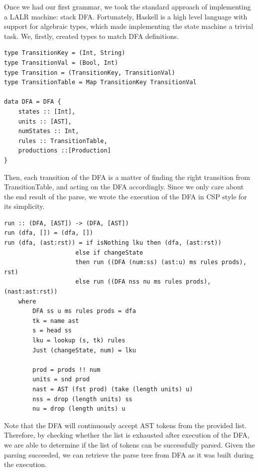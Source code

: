 \documentclass[12pt,letterpaper]{article}
\begin{document}
Once we had our first grammar, we took the standard approach of implementing a LALR machine: stack DFA. Fortunately, Haskell is a high level language with support for algebraic types, which made implementing the state machine a trivial task. We, firstly, created types to match DFA definitions.
\begin{lstlisting}
type TransitionKey = (Int, String)
type TransitionVal = (Bool, Int)
type Transition = (TransitionKey, TransitionVal)
type TransitionTable = Map TransitionKey TransitionVal

data DFA = DFA {
    states :: [Int],
    units :: [AST],
    numStates :: Int,
    rules :: TransitionTable,
    productions ::[Production]
}
\end{lstlisting}

Then, each transition of the DFA is a matter of finding the right transition from TransitionTable, and acting on the DFA accordingly. Since we only care about the end result of the parse, we wrote the execution of the DFA in CSP style for its simplicity.
\begin{lstlisting}
run :: (DFA, [AST]) -> (DFA, [AST])
run (dfa, []) = (dfa, [])
run (dfa, (ast:rst)) = if isNothing lku then (dfa, (ast:rst))
                    else if changeState
                    then run ((DFA (num:ss) (ast:u) ms rules prods), rst)
                    else run ((DFA nss nu ms rules prods), (nast:ast:rst))
    where
        DFA ss u ms rules prods = dfa
        tk = name ast
        s = head ss
        lku = lookup (s, tk) rules
        Just (changeState, num) = lku

        prod = prods !! num
        units = snd prod
        nast = AST (fst prod) (take (length units) u)
        nss = drop (length units) ss
        nu = drop (length units) u
\end{lstlisting}

Note that the DFA will continuously accept AST tokens from the provided list. Therefore, by checking whether the list is exhausted after execution of the DFA, we are able to determine if the list of tokens can be successfully parsed. Given the parsing succeeded, we can retrieve the parse tree from DFA as it was built during the execution.
\end{document}
